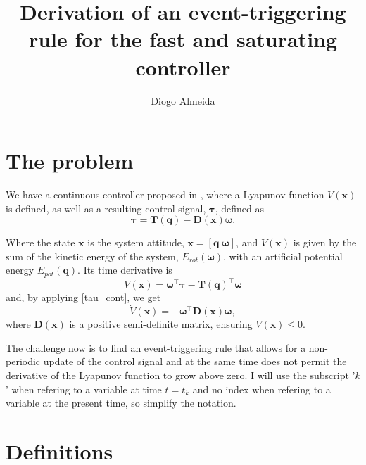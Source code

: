\documentclass{article}
\begin{document}
	\title{Derivation of an event-triggering rule for the fast and saturating controller}
	\author{Diogo Almeida}
	\maketitle	
	
	\section{The problem}
		We have a continuous controller proposed in \cite{lohmann_attitude}, where a Lyapunov function $V(\mathbf{x})$ is defined, as well as a resulting control signal, $\boldsymbol \tau$, defined as
		\begin{equation}
			\boldsymbol \tau = \mathbf{T(q)} - \mathbf{D(x)} \boldsymbol \omega.
			\label{tau_cont}
		\end{equation}
		
		Where the state $\mathbf{x}$ is the system attitude, $\mathbf{x} = \left [\mathbf{q} \; \boldsymbol \omega \right]$, and $V(\mathbf{x})$ is given by the sum of the kinetic energy of the system, $E_{rot}(\boldsymbol \omega)$, with an artificial potential energy $E_{pot}(\mathbf{q})$. Its time derivative is
		\[
			\dot V(\mathbf{x}) = \boldsymbol \omega^\top \boldsymbol \tau - \mathbf{T(q)}^\top \boldsymbol \omega
		\]
		and, by applying \eqref{tau_cont}, we get
		\begin{equation}
			\dot V(\mathbf{x}) = -\boldsymbol \omega^\top \mathbf{D(x)} \boldsymbol \omega,
			\label{vdot_cont}
		\end{equation}
		where $\mathbf{D(x)}$ is a positive semi-definite matrix, ensuring $\dot V(\mathbf{x}) \leq 0$.
		
		The challenge now is to find an event-triggering rule that allows for a non-periodic update of the control signal and at the same time does not permit the derivative of the Lyapunov function to grow above zero. I will use the subscript '$k$' when refering to a variable at time $t=t_k$ and no index when refering to a variable at the present time, so simplify the notation.
	\section{Definitions}
\end{document}
